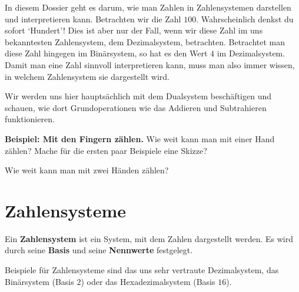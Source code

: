 In diesem Dossier geht es darum, wie man Zahlen in Zahlensystemen darstellen und interpretieren kann. Betrachten wir die Zahl $100$. Wahrscheinlich denkst du sofort `Hundert'! Dies ist aber nur der Fall, wenn wir diese Zahl im uns bekanntesten Zahlensystem, dem Dezimalsystem, betrachten. Betrachtet man diese Zahl hingegen im Binärsystem, so hat es den Wert $4$ im Dezimalsystem. Damit man eine Zahl sinnvoll interpretieren kann, muss man also immer wissen, in welchem Zahlensystem sie dargestellt wird.

Wir werden uns hier hauptsächlich mit dem Dualsystem beschäftigen und schauen, wie dort Grundoperationen wie das Addieren und Subtrahieren funktionieren.


\textbf{Beispiel: Mit den Fingern zählen.} Wie weit kann man mit einer Hand zählen? Mache für die ersten paar Beispiele eine Skizze?


Wie weit kann man mit zwei Händen zählen?


\newpage

\section{Zahlensysteme}


\begin{definition}
	Ein \textbf{Zahlensystem} ist ein System, mit dem Zahlen dargestellt werden. Es wird durch seine \textbf{Basis} und seine \textbf{Nennwerte} festgelegt.

	Beispiele für Zahlensysteme sind das uns sehr vertraute Dezimalsystem, das Binärsystem (Basis $2$) oder das Hexadezimalsystem (Basis $16$).
\end{definition}

